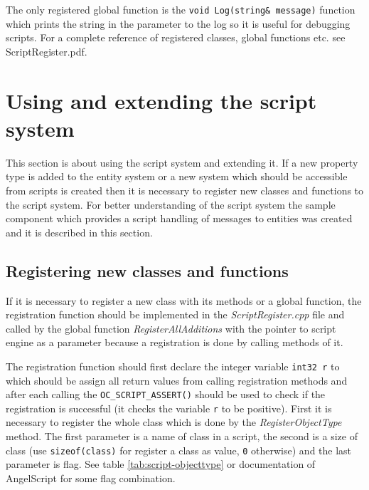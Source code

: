 The only registered global function is the \verb/void Log(string& message)/ function which prints the string in the parameter to the log so it is useful for debugging scripts. For a complete reference of registered classes, global functions etc. see ScriptRegister.pdf.

\section{Using and extending the script system}

This section is about using the script system and extending it. If a new property type is added to the entity system or a new system which should be accessible from scripts is created then it is necessary to register new classes and functions to the script system. For better understanding of the script system the sample component which provides a script handling of messages to entities was created and it is described in this section.

\subsection{Registering new classes and functions}
\label{sub:script-registering}

If it is necessary to register a new class with its methods or a global function, the registration function should be implemented in the \emph{ScriptRegister.cpp} file and called by the global function \emph{RegisterAllAdditions} with the pointer to script engine as a parameter because a registration is done by calling methods of it.

The registration function should first declare the integer variable \verb/int32 r/ to which should be assign all return values from calling registration methods and after each calling the \verb/OC_SCRIPT_ASSERT()/ should be used to check if the registration is successful (it checks the variable \verb/r/ to be positive). First it is necessary to register the whole class which is done by the \emph{RegisterObjectType} method. The first parameter is a name of class in a script, the second is a size of class (use \verb/sizeof(class)/ for register a class as value, \verb/0/ otherwise) and the last parameter is flag. See table \ref{tab:script-objecttype} or documentation of AngelScript \cite{angelscript} for some flag combination.

